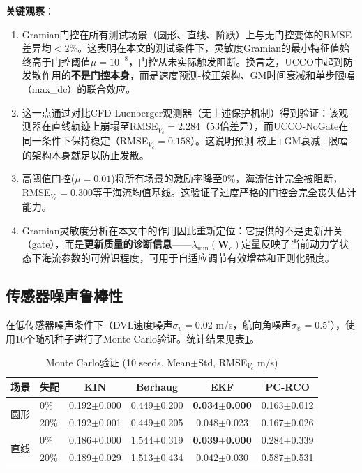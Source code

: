 \textbf{关键观察}：
\begin{enumerate}
    \item Gramian门控在所有测试场景（圆形、直线、阶跃）上与无门控变体的RMSE差异均$<2\%$。这表明在本文的测试条件下，灵敏度Gramian的最小特征值始终高于门控阈值$\mu=10^{-8}$，门控从未实际触发阻断。换言之，UCCO中起到防发散作用的\textbf{不是门控本身}，而是速度预测-校正架构、GM时间衰减和单步限幅（max\_dc）的联合效应。
    \item 这一点通过对比CFD-Luenberger观测器（无上述保护机制）得到验证：该观测器在直线轨迹上崩塌至RMSE$_{V_c}=2.284$（53倍差异），而UCCO-NoGate在同一条件下保持稳定（RMSE$_{V_c}=0.158$）。这说明预测-校正+GM衰减+限幅的架构本身就足以防止发散。
    \item 高阈值门控($\mu=0.01$)将所有场景的激励率降至0\%，海流估计完全被阻断，RMSE$_{V_c}=0.300$等于海流均值基线。这验证了过度严格的门控会完全丧失估计能力。
    \item Gramian灵敏度分析在本文中的作用因此重新定位：它提供的不是更新开关（gate），而是\textbf{更新质量的诊断信息}——$\lambda_{\min}(\bm{W}_c)$定量反映了当前动力学状态下海流参数的可辨识程度，可用于自适应调节有效增益和正则化强度。
\end{enumerate}

\subsection{传感器噪声鲁棒性}

在低传感器噪声条件下（DVL速度噪声$\sigma_v=0.02$ m/s，航向角噪声$\sigma_\psi=0.5^\circ$），使用10个随机种子进行了Monte Carlo验证。统计结果见表\ref{tab:montecarlo}。

\begin{table}[h]
\centering
\caption{Monte Carlo验证 (10 seeds, Mean$\pm$Std, RMSE$_{V_c}$ m/s)}
\label{tab:montecarlo}
\begin{tabular}{llcccc}
\toprule
场景 & 失配 & KIN & B{\o}rhaug & EKF & PC-RCO \\
\midrule
\multirow{2}{*}{圆形} & 0\%   & 0.192$\pm$0.000 & 0.449$\pm$0.200 & \textbf{0.034$\pm$0.000} & 0.163$\pm$0.012 \\
                      & 20\%  & 0.192$\pm$0.001 & 0.449$\pm$0.205 & 0.048$\pm$0.023 & 0.167$\pm$0.026 \\
\midrule
\multirow{2}{*}{直线} & 0\%   & 0.186$\pm$0.000 & 1.544$\pm$0.319 & \textbf{0.039$\pm$0.000} & 0.284$\pm$0.339 \\
                      & 20\%  & 0.189$\pm$0.029 & 1.513$\pm$0.434 & 0.042$\pm$0.030 & 0.587$\pm$0.531 \\
\bottomrule
\end{tabular}
\end{table}


